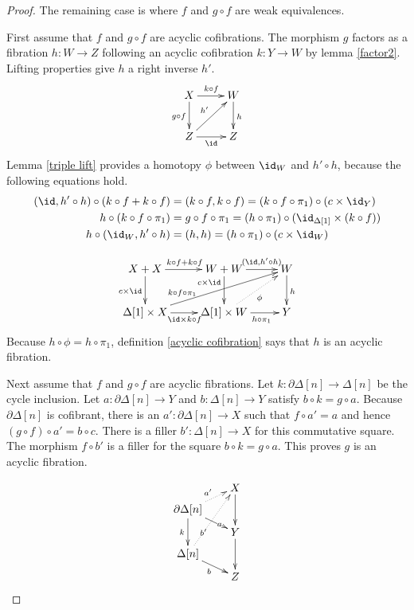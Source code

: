 \documentclass{tac}
\newcommand\of{:}
\newcommand\simplex\Delta
\newcommand\cycle{\partial\Delta}
\begin{document}
\begin{proof}
The remaining case is where $f$ and $g\circ f$ are weak equivalences.

First assume that $f$ and $g\circ f$ are acyclic cofibrations. The morphism $g$ factors as a fibration $h\of W\to Z$ following an acyclic cofibration $k\of Y\to W$ by lemma \ref{factor2}. Lifting properties give $h$ a right inverse $h'$.
\[\xymatrix{
X\ar[r]^{k\circ f}\ar[d]_{g\circ f} & W\ar[d]^h\\
Z\ar[r]_\id \ar[ur]^{h'} & Z
}\]
Lemma \ref{triple lift} provides a homotopy $\phi$ between $\id_W$ and $h'\circ h$, because the following equations hold.
\begin{align*}
(\id,h'\circ h)\circ(k\circ f+k\circ f)&= (k\circ f,k\circ f) = (k\circ f\circ \pi_1)\circ(c\times \id_Y)\\
h\circ(k\circ f\circ\pi_1) &= g\circ f\circ\pi_1 = (h\circ\pi_1)\circ(\id_{\simplex[1]}\times (k\circ f))\\
h\circ(\id_W,h'\circ h) &= (h,h) = (h\circ\pi_1)\circ(c\times\id_W)
\end{align*}

\[\xymatrix{
X+X\ar[r]^{k\circ f+k\circ f}\ar[d]_{c\times \id} & W+W\ar[r]^(.6){(\id,h'\circ h)}\ar[d]_(.3){c\times\id} & W\ar[d]^h\\
\simplex[1]\times X\ar[r]_{\id\times k\circ f}\ar[urr]^(.3){k\circ f\circ\pi_1} & \simplex[1]\times W\ar[r]_(.6){h\circ \pi_1}\ar@{.>}[ur]_{\phi} & Y
}\]
Because $h\circ \phi = h\circ \pi_1$, definition \ref{acyclic cofibration} says that $h$ is an acyclic fibration.

Next assume that $f$ and $g\circ f$ are acyclic fibrations. Let $k\of\cycle[n]\to\simplex[n]$ be the cycle inclusion. Let $a\of\cycle[n]\to Y$ and $b\of\simplex[n]\to Y$ satisfy $b\circ k = g \circ a$. Because $\cycle[n]$ is cofibrant, there is an $a'\of \cycle[n]\to X$ such that $f\circ a' = a$ and hence $(g\circ f)\circ a' = b\circ c$. There is a filler $b'\of\simplex[n]\to X$ for this commutative square. The morphism $f\circ b'$ is a filler for the square $b\circ k = g \circ a$. This proves $g$ is an acyclic fibration.

\[\xy
(14\halfrootthree,28)*+{X}="x", (0,21)*+{\cycle[n]}="v", (14\halfrootthree,14)*+{Y}="y", (0,7)*+{\simplex[n]}="w", (14\halfrootthree,0)*+{Z}="z"
\ar@{.>}^{a'} "v";"x" \ar|(.67)a "v";"y" \ar_k "v";"w"
\ar@{.>}|(.33){b'} "w";"x" \ar_b "w";"z"
\ar "x";"y" \ar "y";"z"
\endxy\]


\end{proof}
\end{document}
